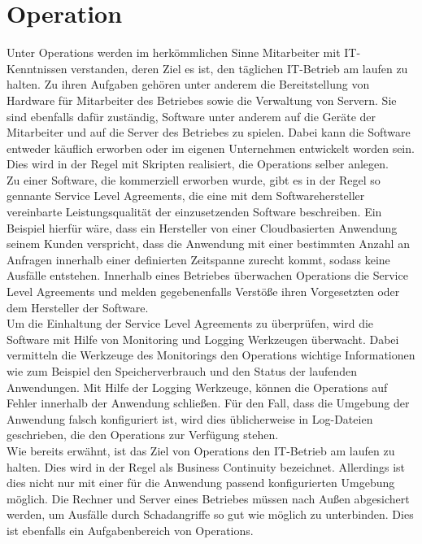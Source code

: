 \section{Operation}
Unter Operations werden im herkömmlichen Sinne Mitarbeiter mit IT-Kenntnissen verstanden, deren Ziel es ist, den täglichen IT-Betrieb am laufen zu halten. Zu ihren Aufgaben gehören unter anderem die Bereitstellung von Hardware für Mitarbeiter des Betriebes sowie die Verwaltung von Servern. Sie sind ebenfalls dafür zuständig, Software unter anderem auf die Geräte der Mitarbeiter und auf die Server des Betriebes zu spielen. Dabei kann die Software entweder käuflich erworben oder im eigenen Unternehmen entwickelt worden sein. Dies wird in der Regel mit Skripten realisiert, die Operations selber anlegen.\\
Zu einer Software, die kommerziell erworben wurde, gibt es in der Regel so gennante Service Level Agreements, die eine mit dem Softwarehersteller vereinbarte Leistungsqualität der einzusetzenden Software beschreiben. Ein Beispiel hierfür wäre, dass ein Hersteller von einer Cloudbasierten Anwendung seinem Kunden verspricht, dass die Anwendung mit einer bestimmten Anzahl an Anfragen innerhalb einer definierten Zeitspanne zurecht kommt, sodass keine Ausfälle entstehen. Innerhalb eines Betriebes überwachen Operations die Service Level Agreements und melden gegebenenfalls Verstöße ihren Vorgesetzten oder dem Hersteller der Software. \\
Um die Einhaltung der Service Level Agreements zu überprüfen, wird die Software mit Hilfe von Monitoring und Logging Werkzeugen überwacht. Dabei vermitteln die Werkzeuge des Monitorings den Operations wichtige Informationen wie zum Beispiel den Speicherverbrauch und den Status der laufenden Anwendungen. Mit Hilfe der Logging Werkzeuge, können die Operations auf Fehler innerhalb der Anwendung schließen. Für den Fall, dass die Umgebung der Anwendung falsch konfiguriert ist, wird dies üblicherweise in Log-Dateien geschrieben, die den Operations zur Verfügung stehen. \\
Wie bereits erwähnt, ist das Ziel von Operations den IT-Betrieb am laufen zu halten. Dies wird in der Regel als Business Continuity bezeichnet. Allerdings ist dies nicht nur mit einer für die Anwendung passend konfigurierten Umgebung möglich. Die Rechner und Server eines Betriebes müssen nach Außen abgesichert werden, um Ausfälle durch Schadangriffe so gut wie möglich zu unterbinden. Dies ist ebenfalls ein Aufgabenbereich von Operations.

